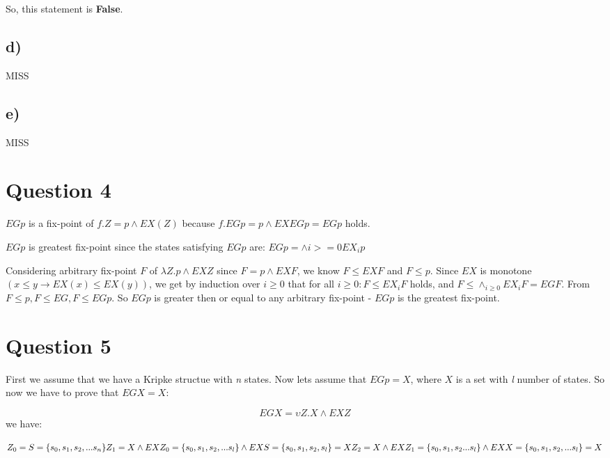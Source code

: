 \documentclass[a4paper]{article}
\begin{document}
So, this statement is \textbf{False}.

\subsection*{d)}

MISS


\subsection*{e)}

MISS


\section{Question 4}

$EG p$ is a fix-point of $f.Z = p \land EX(Z)$ because $f.EG p = p \land EX EG p=EG p$ holds.

$EG p$ is greatest fix-point since the states satisfying $EG p$ are: $EG p=\land i >= 0EX_{i}p$

Considering arbitrary fix-point $F$ of $\lambda Z.p \land EX Z$ since $F=p \land EX F$, we know $F \leq EX F$ and $F \leq p$. Since $EX$ is monotone $( x \leq y \to EX(x) \leq EX(y))$, we get by induction over $i \geq 0$ that for all $i \geq 0: F \leq EX_i F$ holds, and $F \leq \land_{i \geq 0} EX_iF=EG F$. From $F\leq p, F\leq EG, F\leq EG p$. So $EG p$ is greater then or equal to any arbitrary fix-point - $EG p$ is the greatest fix-point.

\section{Question 5}

First we assume that we have a Kripke structue with \textit{n} states. Now lets assume that $EG p=X$, where $X$ is a set with \textit{l} number of states. So now we have to prove that $EG X=X$:

\[
EG X = \upsilon Z.X \land EX Z 
\] we have: 


$
Z_0=S=\{s_0,s_1,s_2,...s_n\} \\
Z_1=X \land EX Z_0 = \{s_0,s_1,s_2,...s_l\} \land EX S = \{s_0,s_1,s_2, s_l\}=X \\ 
Z_2=X \land EX Z_1= \{s_0,s_1,s_2...s_l\} \land EX X = \{s_0,s_1,s_2,... s_l\}=X \\
$
\end{document}
